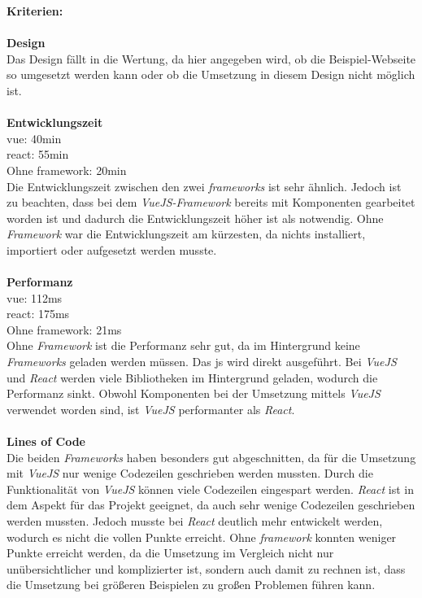\textbf{Kriterien:}\\\\
\textbf{Design}\\
Das Design fällt in die Wertung, da hier angegeben wird, ob die Beispiel-Webseite so umgesetzt werden kann oder ob die Umsetzung in diesem Design nicht möglich ist.\\\\
\newpage
\textbf{Entwicklungszeit}\\
\Gls{vue}: 40min\\
\Gls{react}: 55min\\
Ohne \Gls{framework}: 20min\\
Die Entwicklungszeit zwischen den zwei \textit{\Gls{framework}s} ist sehr ähnlich. Jedoch ist zu beachten, dass bei dem \textit{VueJS-Framework} bereits mit Komponenten gearbeitet worden ist und dadurch die Entwicklungszeit höher ist als notwendig. Ohne \textit{Framework} war die Entwicklungszeit am kürzesten, da nichts installiert, importiert oder aufgesetzt werden musste.\\\\
\textbf{Performanz}\\
\Gls{vue}: 112ms\\
\Gls{react}: 175ms\\
Ohne \Gls{framework}: 21ms\\
Ohne \textit{Framework} ist die Performanz sehr gut, da im Hintergrund keine \textit{Frameworks} geladen werden müssen. Das \Gls{js} wird direkt ausgeführt. Bei \textit{VueJS} und \textit{React} werden viele Bibliotheken im Hintergrund geladen, wodurch die Performanz sinkt. Obwohl Komponenten bei der Umsetzung mittels \textit{VueJS} verwendet worden sind, ist \textit{VueJS} performanter als \textit{React}.\\\\
\textbf{Lines of Code}\\
Die beiden \textit{Frameworks} haben besonders gut abgeschnitten, da für die Umsetzung mit \textit{VueJS} nur wenige Codezeilen geschrieben werden mussten. Durch die Funktionalität von \textit{VueJS} können viele Codezeilen eingespart werden. \textit{React} ist in dem Aspekt für das Projekt geeignet, da auch sehr wenige Codezeilen geschrieben werden mussten. Jedoch musste bei \textit{React} deutlich mehr entwickelt werden, wodurch es nicht die vollen Punkte erreicht.
Ohne \textit{\Gls{framework}} konnten weniger Punkte erreicht werden, da die Umsetzung im Vergleich nicht nur unübersichtlicher und komplizierter ist, sondern auch damit zu rechnen ist, dass die Umsetzung bei größeren Beispielen zu großen Problemen führen kann.
\newpage
